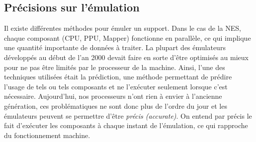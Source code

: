 \subsection{Précisions sur l'émulation}
\label{subsec:precision_sur_lemulation}

Il existe différentes méthodes pour émuler un support. Dans le cas de la NES, chaque composant (CPU, PPU, Mapper) fonctionne en parallèle, ce qui implique une quantité importante de données à traiter. La plupart des émulateurs développés au début de l'an 2000 devait faire en sorte d'être optimisés au mieux pour ne pas être limités par le processeur de la machine. Ainsi, l'une des techniques utilisées était la prédiction, une méthode permettant de prédire l'usage de tels ou tels composants et ne l’exécuter seulement lorsque c'est nécessaire. Aujourd'hui, nos processeurs n'ont rien à envier à l'ancienne génération, ces problématiques ne sont donc plus de l'ordre du jour et les émulateurs peuvent se permettre d'être \emph{précis (accurate)}. On entend par précis le fait d’exécuter les composants à chaque instant de l'émulation, ce qui rapproche du fonctionnement machine.
